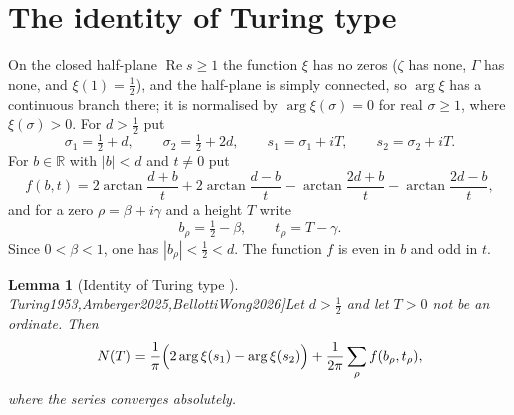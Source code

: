 \documentclass[11pt,reqno]{amsart}
\makeatletter
\let\CG@origcite\cite
\renewcommand*{\cite}[2][]{\def\CG@citekey{#2}%
  \ifx\relax#1\relax\CG@origcite{#2}\else\CG@origcite[#1]{#2}\fi}
\numberwithin{equation}{section}
\newtheorem{lemma}[theorem]{Lemma}
\theoremstyle{definition}
\theoremstyle{remark}
\newcommand{\R}{\mathbb R}
\newcommand{\Rp}{\operatorname{Re}}
\makeatother
\begin{document}
\section{The identity of Turing type}\label{sec:identity}

On the closed half-plane $\Rp s\ge1$ the function $\xi$ has no zeros ($\zeta$ has none, $\Gamma$ has none, and $\xi(1)=\frac12$), and the half-plane is simply connected, so $\arg\xi$ has a continuous branch there; it is normalised by $\arg\xi(\sigma)=0$ for real $\sigma\ge1$, where $\xi(\sigma)>0$. For $d>\frac12$ put
\begin{equation}
\sigma_1=\tfrac12+d,\qquad\sigma_2=\tfrac12+2d,\qquad s_1=\sigma_1+iT,\qquad s_2=\sigma_2+iT .
\label{eq:sigma12}
\end{equation}
For $b\in\R$ with $|b|<d$ and $t\ne0$ put
\begin{equation}
f(b,t)=2\arctan\frac{d+b}t+2\arctan\frac{d-b}t-\arctan\frac{2d+b}t-\arctan\frac{2d-b}t,
\label{eq:f_def}
\end{equation}
and for a zero $\rho=\beta+i\gamma$ and a height $T$ write
\begin{equation}
b_\rho=\tfrac12-\beta,\qquad t_\rho=T-\gamma .
\label{eq:b_t_rho}
\end{equation}
Since $0<\beta<1$, one has $|b_\rho|<\frac12<d$. The function $f$ is even in $b$ and odd in $t$.

\begin{lemma}[Identity of Turing type \cite{Turing1953,Amberger2025,BellottiWong2026}]\label{lem:identity}
Let $d>\frac12$ and let $T>0$ not be an ordinate. Then
\begin{equation}
N(T)=\frac1\pi\Bigl(2\arg\xi(s_1)-\arg\xi(s_2)\Bigr)+\frac1{2\pi}\sum_\rho f(b_\rho,t_\rho),
\label{eq:identity}
\end{equation}
where the series converges absolutely.
\end{lemma}
\end{document}
